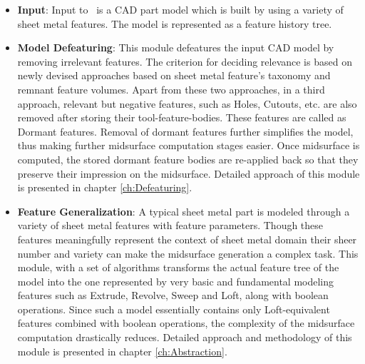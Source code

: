 \begin{itemize}[noitemsep,topsep=2pt,parsep=2pt,partopsep=2pt]

\item \textbf{Input}:  Input to \mysystemname~is a CAD part model which is built by using a variety of sheet metal features. The model is represented as a feature history tree.

\item \textbf{Model Defeaturing}: This module defeatures the input CAD model by removing irrelevant features. The criterion for deciding relevance is based on newly devised approaches based on sheet metal feature's taxonomy and remnant feature volumes. Apart from these two approaches, in a third approach, relevant but negative features, such as Holes, Cutouts, etc. are also removed after storing their tool-feature-bodies. These features are called as Dormant features. Removal of dormant features further simplifies the model, thus making further midsurface computation stages easier. Once midsurface is computed, the stored dormant feature bodies are re-applied back so that they preserve their impression on the midsurface. Detailed approach of this module is presented in chapter \ref{ch:Defeaturing}.


\item \textbf{Feature Generalization}: A typical sheet metal part is modeled through a variety of sheet metal features with feature parameters. Though these features meaningfully represent the context of sheet metal domain their sheer number and variety can make the midsurface generation a complex task.  This module, with a set of algorithms transforms the actual feature tree of the model into the one represented by very basic and fundamental modeling features such as Extrude, Revolve, Sweep and Loft, along with boolean operations.   Since such a model essentially contains only Loft-equivalent features combined with boolean operations, the complexity of the midsurface computation drastically reduces. Detailed approach and methodology of this module is presented in chapter \ref{ch:Abstraction}.


\end{itemize}
